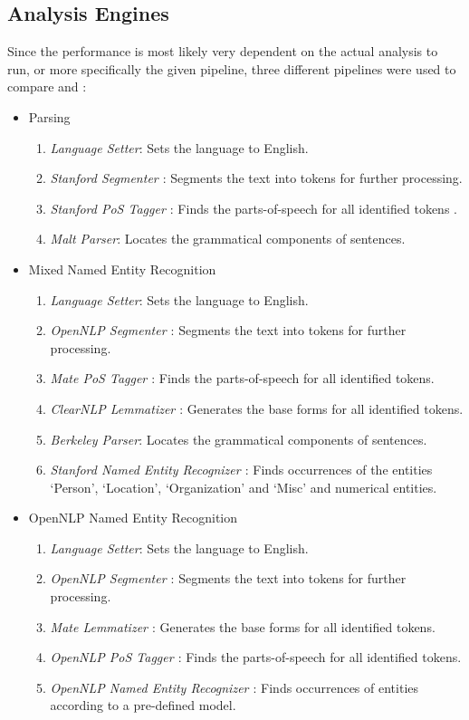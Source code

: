 \subsection{Analysis Engines}
\label{ssec:pipelines}
Since the performance is most likely very dependent on the actual analysis to run, or more specifically the given pipeline, three different pipelines were used to compare \uimaas{} and \spark{}:
\begin{itemize}
	\item{}Parsing
	\begin{enumerate}
		\item{}\emph{Language Setter}: Sets the \cas{} language to English. 
		\item{}\emph{Stanford Segmenter \cite{manning-EtAl:2014:P14-5}}: Segments the text into tokens for further processing.
		\item{}\emph{Stanford PoS Tagger \cite{manning-EtAl:2014:P14-5}}: Finds the parts-of-speech for all identified tokens \cite{toutanova2003feature}.
		\item{}\emph{Malt Parser\cite{Nivre05maltparser:a}}: Locates the grammatical components of sentences.
	\end{enumerate}
	\item{}Mixed Named Entity Recognition
	\begin{enumerate}
		\item{}\emph{Language Setter}: Sets the \cas{} language to English. 
		\item{}\emph{OpenNLP Segmenter \cite{opennlp}}: Segments the text into tokens for further processing.
		\item{}\emph{Mate PoS Tagger \cite{bohnet2010very}}: Finds the parts-of-speech for all identified tokens.
		\item{}\emph{ClearNLP Lemmatizer \cite{manning-EtAl:2014:P14-5}}: Generates the base forms for all identified tokens.
		\item{}\emph{Berkeley Parser\cite{petrov2006learning,petrov2007improved}}: Locates the grammatical components of sentences.
		\item{}\emph{Stanford Named Entity Recognizer \cite{manning-EtAl:2014:P14-5}}: Finds occurrences of the entities `Person', `Location', `Organization' and `Misc' and numerical entities.
	\end{enumerate}
	\item{}OpenNLP Named Entity Recognition
	\begin{enumerate}
		\item{}\emph{Language Setter}: Sets the \cas{} language to English. 
		\item{}\emph{OpenNLP Segmenter \cite{opennlp}}: Segments the text into tokens for further processing.
		\item{}\emph{Mate Lemmatizer \cite{bohnet2010very}}: Generates the base forms for all identified tokens.
		\item{}\emph{OpenNLP PoS Tagger \cite{opennlp}}: Finds the parts-of-speech for all identified tokens.
		\item{}\emph{OpenNLP Named Entity Recognizer \cite{opennlp}}: Finds occurrences of entities according to a pre-defined model.
		

\end{enumerate}
\end{itemize}

